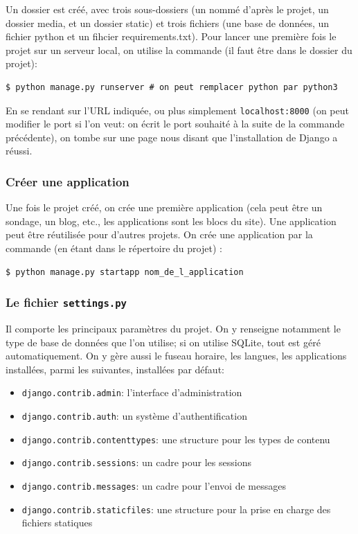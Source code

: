 \documentclass[a4paper, 10pt]{article}
\begin{document}
Un dossier est créé, avec trois sous-dossiers (un nommé d'après le projet, un dossier media, et un dossier static) et trois fichiers (une base de données, un fichier python et un fihcier requirements.txt). Pour lancer une première fois le projet sur un serveur local, on utilise la commande (il faut être dans le dossier du projet):
\begin{verbatim}
$ python manage.py runserver # on peut remplacer python par python3
\end{verbatim}
En se rendant sur l’URL indiquée, ou plus simplement \texttt{localhost:8000} (on peut modifier le port si l'on veut: on écrit le port souhaité à la suite de la commande précédente), on tombe sur une page nous disant que l'installation de Django a réussi.

\subsubsection{Créer une application}
Une fois le projet créé, on crée une première application (cela peut être un sondage, un blog, etc., les applications sont les blocs du site). Une application peut être réutilisée pour d'autres projets. On crée une application par la commande (en étant dans le répertoire du projet) :
\begin{verbatim}
$ python manage.py startapp nom_de_l_application
\end{verbatim}

\subsubsection{Le fichier \texttt{settings.py}}
Il comporte les principaux paramètres du projet. On y renseigne notamment le type de base de données que l'on utilise; si on utilise SQLite, tout est géré automatiquement. On y gère aussi le fuseau horaire, les langues, les applications installées, parmi les suivantes, installées par défaut:
\begin{itemize}
	\item \texttt{django.contrib.admin}: l'interface d'administration
	\item \texttt{django.contrib.auth}: un système d'authentification
	\item \texttt{django.contrib.contenttypes}: une structure pour les types de contenu
	\item \texttt{django.contrib.sessions}: un cadre pour les sessions
	\item \texttt{django.contrib.messages}: un cadre pour l'envoi de messages
	\item \texttt{django.contrib.staticfiles}: une structure pour la prise en charge des fichiers statiques
\end{itemize}
\end{document}
